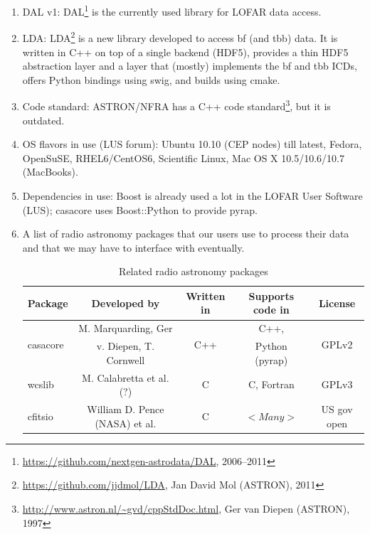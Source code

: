 \documentclass[a4paper,11pt]{article}
\begin{document}
\begin{enumerate}[label=\it E.\arabic{*}]
\item \label{env:DAL} DAL v1: DAL\footnote{\url{https://github.com/nextgen-astrodata/DAL}, 2006--2011} is the currently used library for LOFAR data access.

\item \label{env:LDA} LDA: LDA\footnote{\url{https://github.com/jjdmol/LDA}, Jan David Mol (ASTRON), 2011} is a new library developed to access bf (and tbb) data.
It is written in C++ on top of a single backend (HDF5), provides a thin HDF5 abstraction layer and a layer that (mostly) implements the bf and tbb ICDs, offers Python bindings using swig, and builds using cmake.

\item \label{env:code_std} Code standard: ASTRON/NFRA has a C++ code standard\footnote{\url{http://www.astron.nl/~gvd/cppStdDoc.html}, Ger van Diepen (ASTRON), 1997}, but it is outdated.

\item \label{env:OSes_used} OS flavors in use (LUS forum): Ubuntu 10.10 (CEP nodes) till latest, Fedora, OpenSuSE, RHEL6/CentOS6, Scientific Linux, Mac OS X 10.5/10.6/10.7 (MacBooks).

\item \label{env:deps_in_use} Dependencies in use: Boost is already used a lot in the LOFAR User Software (LUS); casacore uses Boost::Python to provide pyrap.

\item \label{env:radio_astro_pkgs} A list of radio astronomy packages that our users use to process their data and that we may have to interface with eventually.
\begin{table}[htb!]
\centering
\begin{tabular}{lcccc}
\toprule
Package					& Developed by			& Written in		& Supports code in	& License \\
\midrule
\multirow{2}{*}{casacore\footnotemark}	& M. Marquarding, Ger		& \multirow{2}{*}{C++}	& C++,			& \multirow{2}{*}{GPLv2} \\
					& v. Diepen, T. Cornwell	&			& Python (pyrap)	& \\
wcslib\footnotemark			& M. Calabretta et al.(?)	& C			& C, Fortran		& GPLv3	\\
cfitsio\footnotemark			& William D. Pence (NASA) et al.& C			& $<Many>$		& US gov open\\

\bottomrule
\end{tabular}
\caption{Related radio astronomy packages}
\end{table}
\addtocounter{footnote}{-3}	%

\end{enumerate}
\end{document}
